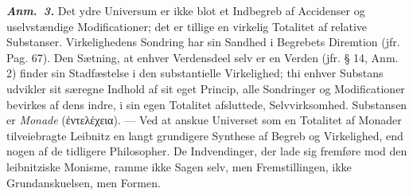 \documentclass[12pt]{book}
\newcommand{\anm}[1]{\emph{\textbf{Anm.~#1.}}}
\begin{document}
\anm{3} Det ydre Universum er ikke blot et Indbegreb af Accidenser og uselvstændige
Modificationer; det er tillige en virkelig Totalitet af relative Substanser.
Virkelighedens Sondring har sin Sandhed i Begrebets Diremtion (jfr. Pag. 67). Den
Sætning, at enhver Verdensdeel selv er en Verden (jfr. § 14, Anm. 2) finder sin
Stadfæstelse i den substantielle Virkelighed; thi enhver Substans udvikler sit særegne
Indhold af sit eget Princip, alle Sondringer og Modificationer bevirkes af dens indre,
i sin egen Totalitet afsluttede, Selvvirksomhed. Substansen er \emph{Monade}
(ἐντελέχεια). --- Ved at anskue Universet som en Totalitet af Monader tilveiebragte
Leibnitz en langt grundigere Synthese af Begreb og Virkelighed, end nogen af de
tidligere Philosopher. De Indvendinger, der lade sig fremføre mod den leibnitziske
Monisme, ramme ikke Sagen selv, men Fremstillingen, ikke Grundanskuelsen, men Formen.
\end{document}
